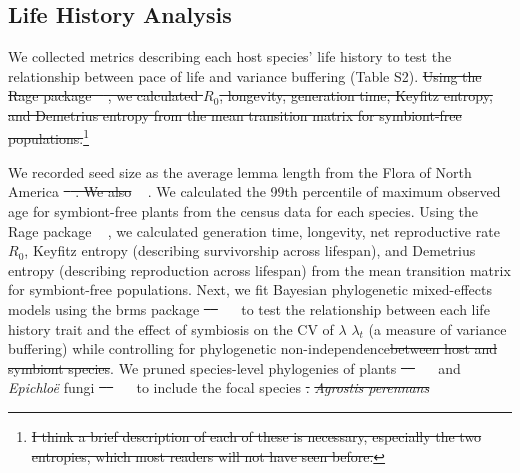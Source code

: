 \documentclass[lineno, sn-basic]{sn-jnl}%
\providecommand{\DIFadd}[1]{{\protect\color{blue}#1}} %
\providecommand{\DIFdel}[1]{{\protect\color{red}\protect\scriptsize\sout{#1}}}
\providecommand{\DIFadd}[1]{{\protect\color{blue}\uwave{#1}}} %
\providecommand{\DIFdel}[1]{{\protect\color{red}\sout{#1}}}                      %
\providecommand{\DIFaddbegin}{} %
\providecommand{\DIFaddend}{} %
\providecommand{\DIFdelbegin}{} %
\providecommand{\DIFdelend}{} %
\newcommand{\DIFscaledelfig}{0.5}
\newlength{\DIFdelgraphicswidth} %
\newlength{\DIFdelgraphicsheight} %
\newcommand{\DIFaddincludegraphics}[2][]{{\color{blue}\fbox{\DIFOincludegraphics[#1]{#2}}}} %
\newcommand{\DIFdelincludegraphics}[2][]{%
\sbox{\DIFdelgraphicsbox}{\DIFOincludegraphics[#1]{#2}}%
\settoboxwidth{\DIFdelgraphicswidth}{\DIFdelgraphicsbox} %
\settoboxtotalheight{\DIFdelgraphicsheight}{\DIFdelgraphicsbox} %
\scalebox{\DIFscaledelfig}{%
\parbox[b]{\DIFdelgraphicswidth}{\usebox{\DIFdelgraphicsbox}\\[-\baselineskip] \rule{\DIFdelgraphicswidth}{0em}}\llap{\resizebox{\DIFdelgraphicswidth}{\DIFdelgraphicsheight}{%
\setlength{\unitlength}{\DIFdelgraphicswidth}%
\begin{picture}(1,1)%
\thicklines\linethickness{2pt} %
{\color[rgb]{1,0,0}\put(0,0){\framebox(1,1){}}}%
{\color[rgb]{1,0,0}\put(0,0){\line( 1,1){1}}}%
{\color[rgb]{1,0,0}\put(0,1){\line(1,-1){1}}}%
\end{picture}%
}\hspace*{3pt}}} %
} %
\DeclareRobustCommand{\DIFaddbegin}{\DIFOaddbegin \let\includegraphics\DIFaddincludegraphics} %
\DeclareRobustCommand{\DIFaddend}{\DIFOaddend \let\includegraphics\DIFOincludegraphics} %
\DeclareRobustCommand{\DIFdelbegin}{\DIFOdelbegin \let\includegraphics\DIFdelincludegraphics} %
\DeclareRobustCommand{\DIFdelend}{\DIFOaddend \let\includegraphics\DIFOincludegraphics} %
\begin{document}
\subsection*{Life History Analysis}
We collected metrics describing each host species' life history to test the relationship between pace of life and variance buffering (Table S2). 
\DIFdelbegin \DIFdel{Using the Rage package \mbox{%
\cite{jones2022rcompadre}}\hspace{0pt}%
, we calculated $R_0$, longevity, generation time, Keyfitz entropy, and Demetrius entropy from the mean transition matrix for symbiont-free populations.}\footnote{\DIFdel{I think a brief description of each of these is necessary, especially the two entropies, which most readers will not have seen before.}}
\addtocounter{footnote}{-1}%
\DIFdelend We recorded seed size as the average lemma length from the Flora of North America \DIFdelbegin \DIFdel{\mbox{%
\cite{FloraNAonline}}\hspace{0pt}%
. 
We also }\DIFdelend \DIFaddbegin \DIFadd{\mbox{%
\citep{FloraNAonline}}\hspace{0pt}%
. 
We }\DIFaddend calculated the 99th percentile of maximum observed age for symbiont-free plants from the census data for each species.
\DIFaddbegin \DIFadd{Using the Rage package \mbox{%
\citep{jones2022rcompadre}}\hspace{0pt}%
, we calculated generation time, longevity, net reproductive rate $R_0$, Keyfitz entropy (describing survivorship across lifespan), and Demetrius entropy (describing reproduction across lifespan) from the mean transition matrix for symbiont-free populations.
}\DIFaddend Next, we fit Bayesian phylogenetic mixed-effects models using the brms package \DIFdelbegin \DIFdel{\mbox{%
\cite{Burkner2017brms} }\hspace{0pt}%
}\DIFdelend \DIFaddbegin \DIFadd{\mbox{%
\citep{Burkner2017brms} }\hspace{0pt}%
}\DIFaddend to test the relationship between each life history trait and the effect of symbiosis on the CV of \DIFdelbegin \DIFdel{$\lambda$ }\DIFdelend \DIFaddbegin \DIFadd{$\lambda_{t}$ }\DIFaddend (a measure of variance buffering) while controlling for phylogenetic non-independence\DIFdelbegin \DIFdel{between host and symbiont species}\DIFdelend .
We pruned species-level phylogenies of plants \DIFdelbegin \DIFdel{\mbox{%
\cite{zanne2014three} }\hspace{0pt}%
}\DIFdelend \DIFaddbegin \DIFadd{\mbox{%
\citep{zanne2014three} }\hspace{0pt}%
}\DIFaddend and \emph{Epichlo\"{e}} fungi \DIFdelbegin \DIFdel{\mbox{%
\cite{leuchtmann2014nomenclatural} }\hspace{0pt}%
}\DIFdelend \DIFaddbegin \DIFadd{\mbox{%
\citep{leuchtmann2014nomenclatural} }\hspace{0pt}%
}\DIFaddend to include the focal species \DIFdelbegin \DIFdel{.
	}\emph{\DIFdel{Agrostis perennans}} %
\end{document}
